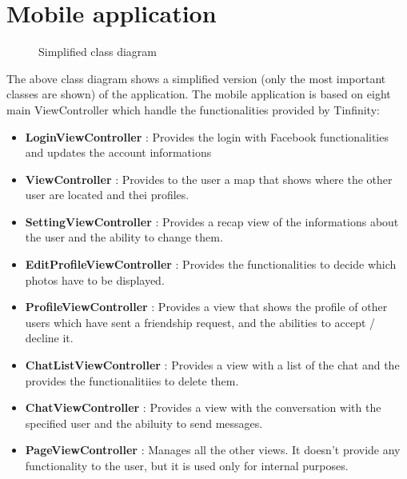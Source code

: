 \section{Mobile application} 

\begin{figure}[H]
\caption{Simplified class diagram}
\end{figure}



The above class diagram shows a simplified version (only the most important classes are shown) of the application. The mobile application is based on eight main ViewController which handle the functionalities provided by Tinfinity:
\begin{itemize}
\item \textbf{LoginViewController} : Provides the login with Facebook functionalities and updates the account informations
\item \textbf{ViewController} : Provides to the user a map that shows where the other user are located and thei profiles.
\item \textbf{SettingViewController} : Provides a recap view of the informations about the user and the ability to change them.
\item \textbf{EditProfileViewController} : Provides the functionalities to decide which photos have to be displayed.
\item \textbf{ProfileViewController} : Provides a view that shows the profile of other users which have sent a friendship request, and the abilities to accept / decline it.
\item \textbf{ChatListViewController} : Provides a view with a list of the chat and the provides the functionalitiies to delete them.
\item \textbf{ChatViewController} : Provides a view with the conversation with the specified user and the abiluity to send messages.
\item \textbf{PageViewController} : Manages all the other views. It doesn't provide any functionality to the user, but it is used only for internal purposes.
\end{itemize}  

